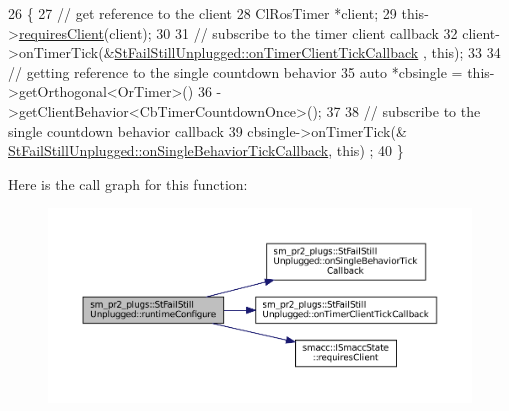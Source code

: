 \begin{DoxyCode}
26     \{
27         \textcolor{comment}{// get reference to the client}
28         ClRosTimer *client;
29         this->\hyperlink{classsmacc_1_1ISmaccState_a7f95c9f0a6ea2d6f18d1aec0519de4ac}{requiresClient}(client);
30 
31         \textcolor{comment}{// subscribe to the timer client callback}
32         client->onTimerTick(&\hyperlink{structsm__pr2__plugs_1_1StFailStillUnplugged_a9778180fa18c15f2d94c774ebde4c7cf}{StFailStillUnplugged::onTimerClientTickCallback}
      , \textcolor{keyword}{this});
33 
34         \textcolor{comment}{// getting reference to the single countdown behavior}
35         \textcolor{keyword}{auto} *cbsingle = this->getOrthogonal<OrTimer>()
36                              ->getClientBehavior<CbTimerCountdownOnce>();
37 
38         \textcolor{comment}{// subscribe to the single countdown behavior callback}
39         cbsingle->onTimerTick(&
      \hyperlink{structsm__pr2__plugs_1_1StFailStillUnplugged_ac9dc49f0681e4d6a17b30461881b9572}{StFailStillUnplugged::onSingleBehaviorTickCallback}, \textcolor{keyword}{this})
      ;
40     \}
\end{DoxyCode}
Here is the call graph for this function\+:
\nopagebreak
\begin{figure}[H]
\begin{center}
\leavevmode
\includegraphics[width=350pt]{structsm__pr2__plugs_1_1StFailStillUnplugged_af8704d60b24ec65be825b5dc416632d1_cgraph}
\end{center}
\end{figure}
\mbox{\label{structsm__pr2__plugs_1_1StFailStillUnplugged_a42820633846d0c87f9793a11b484d292}} 
